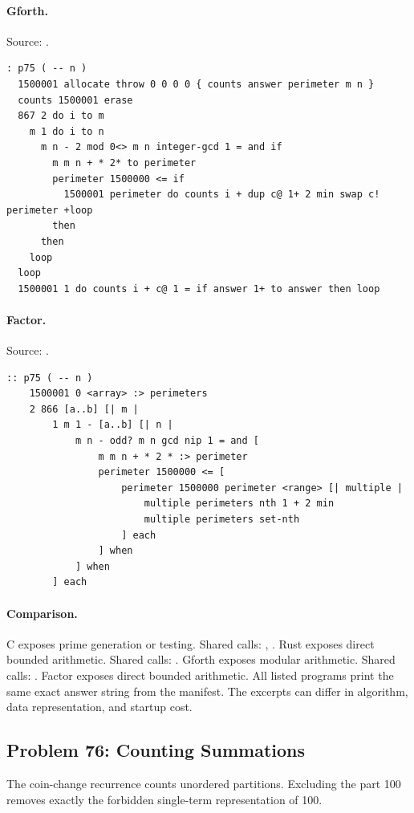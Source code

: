 \paragraph{Gforth.} Source: .
\begin{lstlisting}
: p75 ( -- n )
  1500001 allocate throw 0 0 0 0 { counts answer perimeter m n }
  counts 1500001 erase
  867 2 do i to m
    m 1 do i to n
      m n - 2 mod 0<> m n integer-gcd 1 = and if
        m m n + * 2* to perimeter
        perimeter 1500000 <= if
          1500001 perimeter do counts i + dup c@ 1+ 2 min swap c! perimeter +loop
        then
      then
    loop
  loop
  1500001 1 do counts i + c@ 1 = if answer 1+ to answer then loop
\end{lstlisting}

\paragraph{Factor.} Source: .
\begin{lstlisting}
:: p75 ( -- n )
    1500001 0 <array> :> perimeters
    2 866 [a..b] [| m |
        1 m 1 - [a..b] [| n |
            m n - odd? m n gcd nip 1 = and [
                m m n + * 2 * :> perimeter
                perimeter 1500000 <= [
                    perimeter 1500000 perimeter <range> [| multiple |
                        multiple perimeters nth 1 + 2 min
                        multiple perimeters set-nth
                    ] each
                ] when
            ] when
        ] each
\end{lstlisting}

\paragraph{Comparison.}
C exposes prime generation or testing. Shared calls: \texttt{}, \texttt{}. Rust exposes direct bounded arithmetic. Shared calls: \texttt{}. Gforth exposes modular arithmetic. Shared calls: \texttt{}. Factor exposes direct bounded arithmetic.
All listed programs print the same exact answer string from the manifest. The excerpts can differ in algorithm, data representation, and startup cost.

\subsection{Problem 76: Counting Summations}
\label{walkthrough:p76}
The coin-change recurrence counts unordered partitions. Excluding the part 100 removes exactly the forbidden single-term representation of 100.

